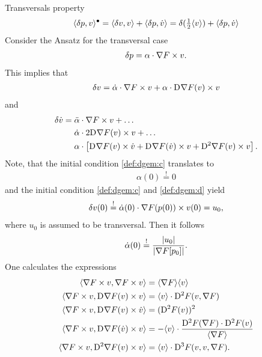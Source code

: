 Transversals property
\begin{align}
    \langle  \delta p ,  v  \rangle^\bullet  =
    \langle  \delta v ,  v  \rangle  +  \langle  \delta p ,  \dot{ v }  \rangle  =
    \delta( \tfrac12 \langle  v  \rangle )  +  \langle  \delta p ,  \dot{ v }  \rangle
    \label{def:ta}
\end{align}
Consider the Ansatz for the transversal case
\begin{align}
    \delta p  =  \alpha \cdot \nabla F  \times v .
    \label{eq:tad}
\end{align}
This implies that
\begin{align}
    \delta v  =
    \dot{ \alpha } \cdot \nabla F  \times v  +
    \alpha \cdot \mathrm{D}^{  } \nabla F  ( v ) \times v
    \label{eq:tadd}
\end{align}
and
\begin{align}
    \delta \dot{ v }  &=
    \ddot{ \alpha } \mult \grad{ F } \times v  +  \dots\nonumber\\
    &\hphantom{{}={}}\dot{ \alpha } \mult 2 \diff{}{ \grad{ F } }( v ) \times v  +  \dots\nonumber\\
    &\hphantom{{}={}}\alpha \mult \left[ \diff{}{ \grad{ F } }( v ) \times \dot{ v }  +
    \diff{}{ \grad{ F } }( \dot{ v } ) \times v  +  
    \diff{ 2 }{ \grad{ F } }( v ) \times v \right] .
\end{align}
Note, that the initial condition \eqref{def:dgem:c} translates to
\begin{align}
    \alpha( 0 )  \overset{!}{=}  0
\end{align}
and the initial condition \eqref{def:dgem:c} and \eqref{def:dgem:d} yield
\begin{align}
    \delta v( 0 )   \overset{!}{=}
    \dot{ \alpha }( 0 ) \cdot \nabla F( p( 0 ) ) \times v( 0 )  =  u_0 ,
\end{align}
where $ u_0 $ is assumed to be transversal.
Then it follows 
\begin{align}
    \dot{ \alpha }( 0 )   \overset{!}{=}
    \frac{ \lvert  u_0  \rvert }{ \lvert  \nabla F[ p_0 ]  \rvert } .
\end{align}
One calculates the expressions
\begin{subequations}
    \begin{align}
        \langle  \nabla F  \times v ,  \nabla F  \times v  \rangle  &=
        \langle  \nabla F   \rangle \langle  v  \rangle\\
        \langle  \nabla F  \times v ,  \mathrm{D}^{  } \nabla F  ( v ) \times v  \rangle  &=
        \langle  v  \rangle \cdot \mathrm{D}^{ 2 } F ( v, \nabla F  )\\
        \langle  \nabla F  \times v ,  \mathrm{D}^{  } \nabla F  ( v ) \times \dot{ v }  \rangle  &=
        ( \mathrm{D}^{ 2 } F ( v ) )^2\\
        \langle  \nabla F  \times v ,  \mathrm{D}^{  } \nabla F  ( \dot{ v } ) \times v  \rangle  &=
        -  \langle  v  \rangle \cdot \frac{ \mathrm{D}^{ 2 } F ( \nabla F  ) \cdot \mathrm{D}^{ 2 } F ( v ) }{ \langle  \nabla F   \rangle }\\
        \langle  \nabla F  \times v ,  \mathrm{D}^{ 2 } \nabla F  ( v ) \times v  \rangle  &=
        \langle  v  \rangle \cdot \mathrm{D}^{ 3 } F ( v, v, \nabla F  ) .
    \end{align}
\end{subequations}
